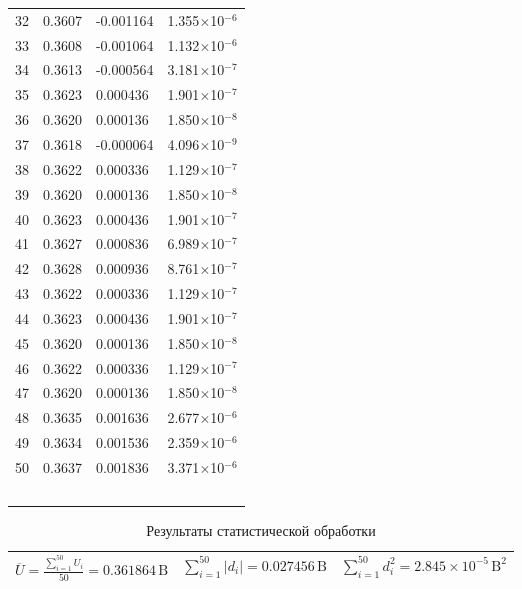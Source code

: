 \begin{longtable}{|c|p{3.2cm}|p{3.5cm}|p{3.5cm}|}
32 & 0.3607 & -0.001164 & 1.355$\times$10$^{-6}$ \\

33 & 0.3608 & -0.001064 & 1.132$\times$10$^{-6}$ \\

34 & 0.3613 & -0.000564 & 3.181$\times$10$^{-7}$ \\

35 & 0.3623 & 0.000436 & 1.901$\times$10$^{-7}$ \\

36 & 0.3620 & 0.000136 & 1.850$\times$10$^{-8}$ \\

37 & 0.3618 & -0.000064 & 4.096$\times$10$^{-9}$ \\

38 & 0.3622 & 0.000336 & 1.129$\times$10$^{-7}$ \\

39 & 0.3620 & 0.000136 & 1.850$\times$10$^{-8}$ \\

40 & 0.3623 & 0.000436 & 1.901$\times$10$^{-7}$ \\

41 & 0.3627 & 0.000836 & 6.989$\times$10$^{-7}$ \\

42 & 0.3628 & 0.000936 & 8.761$\times$10$^{-7}$ \\

43 & 0.3622 & 0.000336 & 1.129$\times$10$^{-7}$ \\

44 & 0.3623 & 0.000436 & 1.901$\times$10$^{-7}$ \\

45 & 0.3620 & 0.000136 & 1.850$\times$10$^{-8}$ \\

46 & 0.3622 & 0.000336 & 1.129$\times$10$^{-7}$ \\
47 & 0.3620 & 0.000136 & 1.850$\times$10$^{-8}$ \\
48 & 0.3635 & 0.001636 & 2.677$\times$10$^{-6}$ \\
49 & 0.3634 & 0.001536 & 2.359$\times$10$^{-6}$ \\
50 & 0.3637 & 0.001836 & 3.371$\times$10$^{-6}$ \\
\

\end{longtable}

\begin{table}[ht!]
\centering
\caption{Результаты статистической обработки}
\label{tab:stats}
\begin{tabular}{|c|c|c|}
\hline
\(\displaystyle \overline{U} = \frac{\sum_{i=1}^{50} U_i}{50} = 0.361864 \, \text{B}\) & 
\(\displaystyle \sum_{i=1}^{50} |d_i| = 0.027456 \, \text{B}\) & 
\(\displaystyle \sum_{i=1}^{50} d_i^2 = 2.845 \times 10^{-5} \, \text{B}^2\) \\
\hline
\end{tabular}
\end{table}


